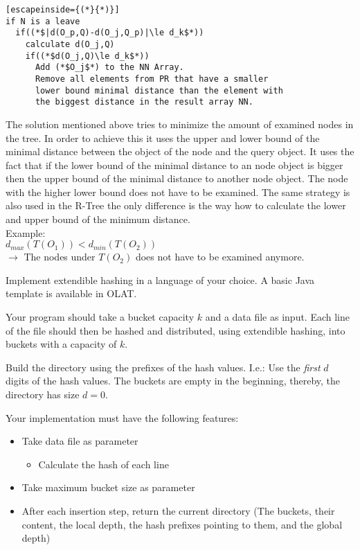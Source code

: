 \begin{enumerate}
\begin{lstlisting}[escapeinside={(*}{*)}]
if N is a leave
  if((*$|d(O_p,Q)-d(O_j,Q_p)|\le d_k$*))
    calculate d(O_j,Q)
    if((*$d(O_j,Q)\le d_k$*))
      Add (*$O_j$*) to the NN Array. 
      Remove all elements from PR that have a smaller 
      lower bound minimal distance than the element with
      the biggest distance in the result array NN.
\end{lstlisting}

The solution mentioned above tries to minimize the amount of examined nodes in the tree. In order to achieve this it 
uses the upper and lower bound of the minimal distance between the object of the node and the query object.
It uses the fact that if the lower bound of the minimal distance to an node object is bigger then the upper bound 
of the minimal distance to another node object. The node with the higher lower bound does not have to be examined.
The same strategy is also used in the R-Tree the only difference is the way how to calculate the lower and upper bound of the minimum distance.\\
Example:\\
$d_{max}(T(O_1)) < d_{min}(T(O_2))$\\
$\rightarrow$ The nodes under $T(O_2)$ does not have to be examined anymore. 
\end{enumerate}


Implement extendible hashing in a language of your choice. A basic Java template is available in OLAT.

Your program should take a bucket capacity $k$ and a data file as input.
Each line of the file should then be hashed and distributed, using extendible hashing, into buckets with a capacity of $k$.

Build the directory using the prefixes of the hash values.
I.e.: Use the \emph{first} $d$ digits of the hash values.
The buckets are empty in the beginning, thereby, the directory has size $d=0$.

Your implementation must have the following features:
\begin{itemize}
\item Take data file as parameter
\begin{itemize}
  \item Calculate the hash of each line
\end{itemize}
\item Take maximum bucket size as parameter
\item After each insertion step, return the current directory (The buckets, their content, the local depth, the hash prefixes pointing to them, and the global depth)
\end{itemize}

